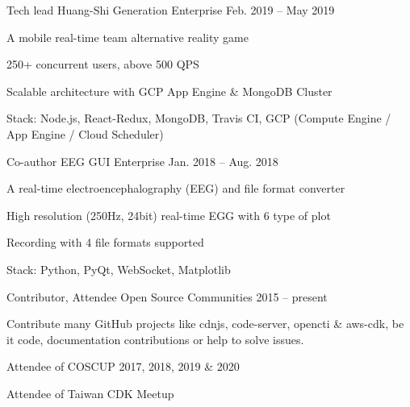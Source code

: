
\begin{cventries}

  \cventry
    {Tech lead} %
    {Huang-Shi Generation} %
    {Enterprise} %
    {Feb. 2019 -- May 2019} %
    {
      \begin{cvitems} %
        \item {A mobile real-time team alternative reality game}
        \item {250+ concurrent users, above 500 QPS}
        \item {Scalable architecture with GCP App Engine \& MongoDB Cluster}
        \item {Stack: Node.js, React-Redux, MongoDB, Travis CI, GCP (Compute Engine / App Engine / Cloud Scheduler)}
      \end{cvitems}
    }

  \cventry
    {Co-author} %
    {EEG GUI} %
    {Enterprise} %
    {Jan. 2018 -- Aug. 2018} %
    {
      \begin{cvitems} %
        \item {A real-time electroencephalography (EEG) and file format converter}
        \item {High resolution (250Hz, 24bit) real-time EGG with 6 type of plot}
        \item {Recording with 4 file formats supported}
        \item {Stack: Python, PyQt, WebSocket, Matplotlib}
      \end{cvitems}
    }

  \cventry
    {Contributor, Attendee} %
    {Open Source Communities} %
    {} %
    {2015 -- present} %
    {
      \begin{cvitems} %
        \item
        {
          Contribute many GitHub projects like cdnjs, code-server, opencti \& aws-cdk,
          be it code, documentation contributions or help to solve issues.
        }
        \item {Attendee of COSCUP 2017, 2018, 2019 \& 2020}
        \item {Attendee of Taiwan CDK Meetup}
      \end{cvitems}
    }

\end{cventries}
